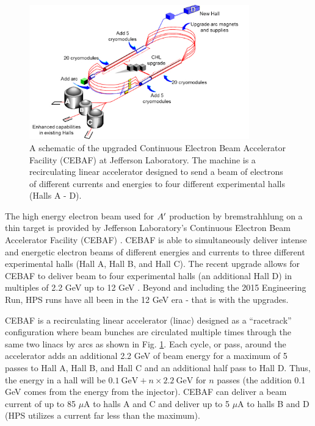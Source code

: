 \begin{figure}
    \centering
    \includegraphics[width=0.85\textwidth]{figs/detector/cebaf.png}
    \caption{A schematic of the upgraded Continuous Electron Beam Accelerator Facility (CEBAF) at Jefferson Laboratory. The machine is a recirculating linear accelerator designed to send a beam of electrons of different currents and energies to four different experimental halls (Halls A - D).}
    \label{fig:cebaf}
\end{figure}

The high energy electron beam used for $A^\prime$ production by bremstrahhlung on a thin target is provided by Jefferson Laboratory's Continuous Electron Beam Accelerator Facility (CEBAF) \cite{Kazimi:2013yua}. CEBAF is able to simultaneously deliver intense and energetic electron beams of different energies and currents to three different experimental halls (Hall A, Hall B, and Hall C). The recent upgrade allows for CEBAF to deliver beam to four experimental halls (an additional Hall D) in multiples of 2.2 GeV up to 12 GeV \cite{Burkert:2012rh} \cite{Dudek:2012vr}. Beyond and including the 2015 Engineering Run, HPS runs have all been in the 12 GeV era - that is with the upgrades.

CEBAF is a recirculating linear accelerator (linac) designed as a ``racetrack'' configuration where beam bunches are circulated multiple times through the same two linacs by arcs as shown in Fig. \ref{fig:cebaf}. Each cycle, or pass, around the accelerator adds an additional 2.2 GeV of beam energy for a maximum of 5 passes to Hall A, Hall B, and Hall C and an additional half pass to Hall D. Thus, the energy in a hall will be $0.1 \ \mathrm{GeV}+ n \times 2.2 \ \mathrm{GeV}$ for $n$ passes (the addition 0.1 GeV comes from the energy from the injector). CEBAF can deliver a beam current of up to 85 $\mu$A to halls A and C and deliver up to 5 $\mu$A to halls B and D (HPS utilizes a current far less than the maximum).

